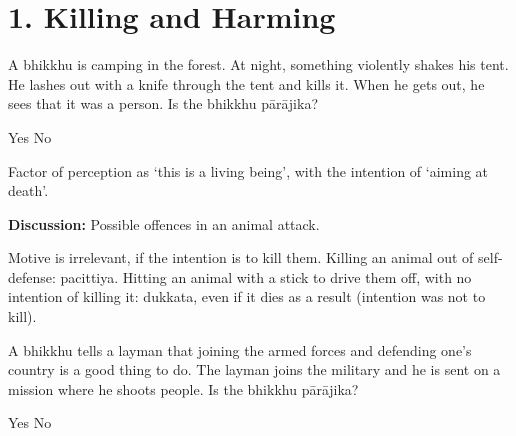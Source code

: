 \chapter{1. Killing and Harming}
\renewcommand*{\theChapterTitle}{1. Killing and Harming}

\begin{exam}{\autoExamName}

\begin{problem*}

  \begin{parts}

  \item A bhikkhu is camping in the forest. At night, something violently shakes
    his tent. He lashes out with a knife through the tent and kills it. When he
    gets out, he sees that it was a person. Is the bhikkhu pārājika?

    \bigskip

    \begin{answers}{2}
      \bChoices
       Yes\eAns
       No\eAns
      \eChoices
    \end{answers}

    \bigskip

    \begin{solution}
      Factor of perception as `this is a living being', with the intention of
      `aiming at death'.
    \end{solution}

    \textbf{Discussion:} Possible offences in an animal attack.

    \begin{solution}
      Motive is irrelevant, if the intention is to kill them. Killing an animal
      out of self-defense: pacittiya. Hitting an animal with a stick to drive
      them off, with no intention of killing it: dukkata, even if it dies as a
      result (intention was not to kill).
    \end{solution}

    \bigskip

  \item A bhikkhu tells a layman that joining the armed forces and defending
    one's country is a good thing to do. The layman joins the military and he is
    sent on a mission where he shoots people. Is the bhikkhu pārājika?

    \bigskip

    \begin{answers}{2}
      \bChoices
       Yes\eAns
       No\eAns
      \eChoices
    \end{answers}


\end{parts}
\end{problem*}
\end{exam}
